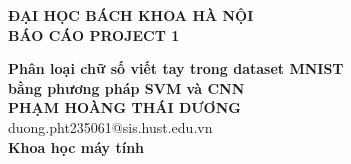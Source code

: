\documentclass[DoAn.tex]{subfiles}
\begin{document}
\begin{titlepage}
\thispagestyle{empty}
\begin{center}

{\textbf{\large{ĐẠI HỌC BÁCH KHOA HÀ NỘI}}}\\[4cm]

{\textbf{\huge{ BÁO CÁO PROJECT 1}}}\\[1cm]
{\textbf{\Large{Phân loại chữ số viết tay trong dataset MNIST \\
bằng phương pháp SVM và CNN}}\\[1cm]

{\textbf{\large{PHẠM HOÀNG THÁI DƯƠNG}}}\\
{\large{duong.pht235061@sis.hust.edu.vn}}\\[0.5cm]

{\textbf{\large{Khoa học máy tính
}}}\\

\vspace{4cm}
\begin{table}[H]
\centering
{}
\end{table}}
\end{center}



\end{titlepage}
\end{document}
